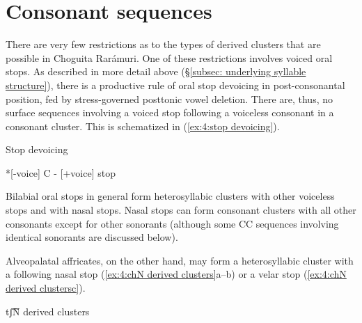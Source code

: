 \section{Consonant sequences}
\label{subsec: consonant sequences}

There are very few restrictions as to the types of derived clusters that are possible in Choguita Rarámuri. One of these restrictions involves voiced oral stops. As described in more detail above (§\ref{subsec: underlying syllable structure}), there is a productive rule of oral stop devoicing in post-consonantal position, fed by stress-governed posttonic vowel deletion. There are, thus, no surface sequences involving a voiced stop following a voiceless consonant in a consonant cluster. This is schematized in (\ref{ex:4:stop devoicing}).

\ea\label{ex:4:stop devoicing}
{Stop devoicing}

*[-voice] C - [+voice] stop

\z

Bilabial oral stops in general form heterosyllabic clusters with other voiceless stops and with nasal stops. Nasal stops can form consonant clusters with all other consonants except for other sonorants (although some CC sequences involving identical sonorants are discussed below).

Alveopalatal affricates, on the other hand, may form a heterosyllabic cluster with a following nasal stop (\ref{ex:4:chN derived clusters}a--b) or a velar stop (\ref{ex:4:chN derived clustersc}).

\ea\label{ex:4:chN derived clusters}
{tʃ͡N derived clusters}

    \label{ex:4:chN derived clustersa}
        \label{ex:4:chN derived clustersb}
            \label{ex:4:chN derived clustersc}
    \z
\z

